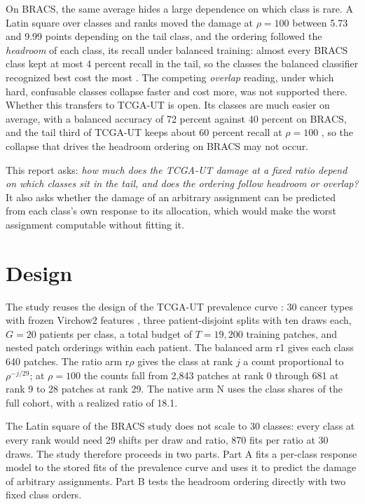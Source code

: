 \documentclass[11pt]{article}
\begin{document}
On BRACS, the same average hides a large dependence on which class is rare. A Latin square over classes and ranks moved the damage at $\rho=100$ between 5.73 and 9.99 points depending on the tail class, and the ordering followed the \emph{headroom} of each class, its recall under balanced training: almost every BRACS class kept at most 4 percent recall in the tail, so the classes the balanced classifier recognized best cost the most \citep{queisler2026tailBracs}. The competing \emph{overlap} reading, under which hard, confusable classes collapse faster and cost more, was not supported there. Whether this transfers to TCGA-UT is open. Its classes are much easier on average, with a balanced accuracy of 72 percent against 40 percent on BRACS, and the tail third of TCGA-UT keeps about 60 percent recall at $\rho=100$ \citep{queisler2026prevalenceTcga}, so the collapse that drives the headroom ordering on BRACS may not occur.

This report asks: \emph{how much does the TCGA-UT damage at a fixed ratio depend on which classes sit in the tail, and does the ordering follow headroom or overlap?} It also asks whether the damage of an arbitrary assignment can be predicted from each class's own response to its allocation, which would make the worst assignment computable without fitting it.

\section{Design}
\label{sec:design}
The study reuses the design of the TCGA-UT prevalence curve \citep{queisler2026prevalenceTcga}: 30 cancer types with frozen Virchow2 features \citep{zimmermann2024virchow2}, three patient-disjoint splits with ten draws each, $G=20$ patients per class, a total budget of $T=19{,}200$ training patches, and nested patch orderings within each patient. The balanced arm r1 gives each class 640 patches. The ratio arm r$\rho$ gives the class at rank $j$ a count proportional to $\rho^{-j/29}$; at $\rho=100$ the counts fall from 2,843 patches at rank 0 through 681 at rank 9 to 28 patches at rank 29. The native arm N uses the class shares of the full cohort, with a realized ratio of 18.1.

The Latin square of the BRACS study does not scale to 30 classes: every class at every rank would need 29 shifts per draw and ratio, 870 fits per ratio at 30 draws. The study therefore proceeds in two parts. Part A fits a per-class response model to the stored fits of the prevalence curve and uses it to predict the damage of arbitrary assignments. Part B tests the headroom ordering directly with two fixed class orders.
\end{document}
